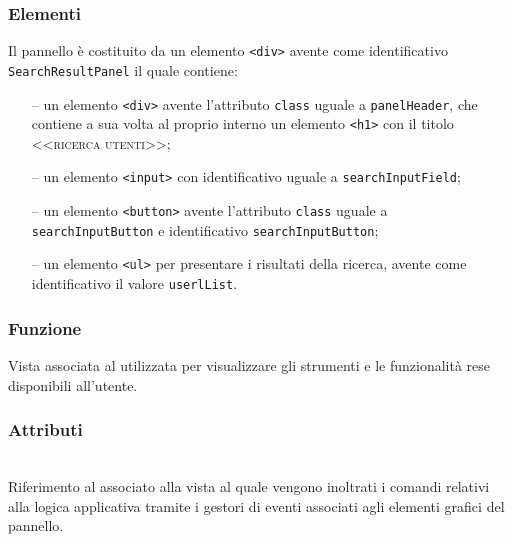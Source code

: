 \subsubsection*{Elementi}
Il pannello è costituito da un elemento \verb'<div>' avente come identificativo \verb'SearchResultPanel' il quale contiene:
\begin{itemize}
  \item[--] un elemento \verb'<div>' avente l'attributo \verb'class' uguale a \verb'panelHeader', che contiene a sua volta al proprio interno un elemento \verb'<h1>' con il titolo \textsc{<<ricerca utenti>>};
  \item[--] un elemento \verb'<input>' con identificativo uguale a \verb'searchInputField';
  \item[--] un elemento \verb'<button>' avente l'attributo \verb'class' uguale a \verb'searchInputButton' e identificativo \verb'searchInputButton';
  \item[--] un elemento \verb'<ul>' per presentare i risultati della ricerca, avente come identificativo il valore \verb'userlList'.
\end{itemize}


\subsubsection*{Funzione}
Vista associata al   utilizzata per visualizzare gli strumenti e le funzionalità rese disponibili all'utente.

\subsubsection*{Attributi}
\begin{description}
  \item{}\\
  Riferimento al  associato alla vista al quale vengono inoltrati i comandi relativi alla logica applicativa tramite i gestori di eventi associati agli elementi grafici del pannello.
\end{description}

